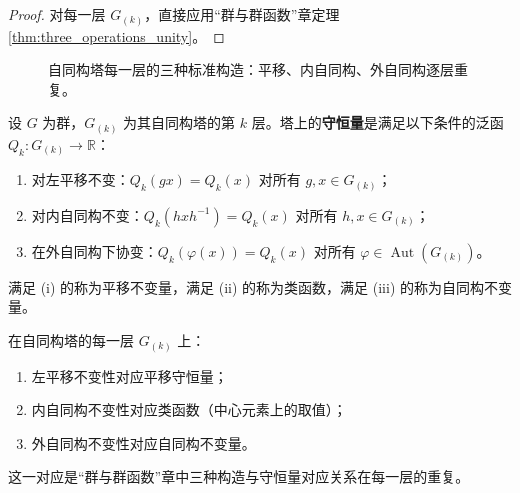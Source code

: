\begin{proof}
对每一层 $G_{(k)}$，直接应用“群与群函数”章定理 \ref{thm:three_operations_unity}。
\end{proof}

\begin{figure}[htbp]
\centering
{}
\caption{自同构塔每一层的三种标准构造：平移、内自同构、外自同构逐层重复。}
\label{fig:tower_three_constructions}
\end{figure}

\begin{definition}[塔上的守恒量]\label{def:higher_conservation_law}
设 $G$ 为群，$G_{(k)}$ 为其自同构塔的第 $k$ 层。塔上的\textbf{守恒量}是满足以下条件的泛函 $Q_k: G_{(k)}\to \mathbb{R}$：
\begin{enumerate}[label=(\roman*)]
    \item 对左平移不变：$Q_k(gx)=Q_k(x)$ 对所有 $g,x\in G_{(k)}$；
    \item 对内自同构不变：$Q_k(hxh^{-1})=Q_k(x)$ 对所有 $h,x\in G_{(k)}$；
    \item 在外自同构下协变：$Q_k(\varphi(x)) = Q_k(x)$ 对所有 $\varphi\in\operatorname{Aut}(G_{(k)})$。
\end{enumerate}
满足 (i) 的称为平移不变量，满足 (ii) 的称为类函数，满足 (iii) 的称为自同构不变量。
\end{definition}

\begin{remark}[塔上三种构造与守恒量的对应]\label{cor:higher_conservation}
在自同构塔的每一层 $G_{(k)}$ 上：
\begin{enumerate}[label=(\roman*)]
    \item 左平移不变性对应平移守恒量；
    \item 内自同构不变性对应类函数（中心元素上的取值）；
    \item 外自同构不变性对应自同构不变量。
\end{enumerate}
这一对应是“群与群函数”章中三种构造与守恒量对应关系在每一层的重复。
\end{remark}

